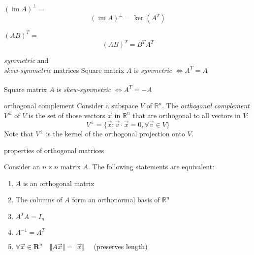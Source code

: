 \documentclass[avery5371,grid,letterpaper]{flashcards}
\newcommand{\Rn}{\mathbb{R}^{n}}
\DeclareMathOperator{\im}{im}
\begin{document}
\begin{flashcard}[Theorem]{$(\im A)^{\bot} = $}
\begin{displaymath}
(\im A)^{\bot} = \ker(A^{T})
\end{displaymath}
\end{flashcard}

\begin{flashcard}[Theorem]{$(AB)^{T} = $}
\begin{displaymath}
(AB)^{T} = B^{T}A^{T}
\end{displaymath}
\end{flashcard}

\begin{flashcard}[Definition]{\textit{symmetric} and \\
\textit{skew-symmetric} matrices}
Square matrix $A$ is \textit{symmetric} $\Leftrightarrow A^{T} = A$
\\
\\
Square matrix $A$ is \textit{skew-symmetric} $\Leftrightarrow A^{T} = -A$
\end{flashcard}

\begin{flashcard}[Definition]{orthogonal complement}
Consider a subspace $V$ of $\Rn$.  The \textit{orthogonal complement}
$V^{\bot}$ of $V$ is the set of those vectors $\vec{x}$ in $\Rn$ that
are orthogonal to all vectors in $V$:
\begin{displaymath}
V^{\bot} = \lbrace \vec{x}: \vec{v}\cdot\vec{x} = 0, \forall \vec{v} \in V \rbrace
\end{displaymath}
Note that $V^{\bot}$ is the kernel of the orthogonal projection onto $V$.
\end{flashcard}

\begin{flashcard}[Theorem]{properties of orthogonal matrices}
\begin{small}
Consider an $n \times n$ matrix $A$.  The following statements are equivalent:
\begin{enumerate}
\item $A$ is an orthogonal matrix
\item The columns of $A$ form an orthonormal basis of $\Rn$
\item $A^{T}A = I_{n}$
\item $A^{-1} = A^{T}$
\item $\forall \vec{x} \in \mathbf{R}^{n} \quad \Vert A\vec{x} \Vert = \Vert \vec{x} \Vert \quad$ (preserves length)
\end{enumerate}
\end{small}
\end{flashcard}
\end{document}
